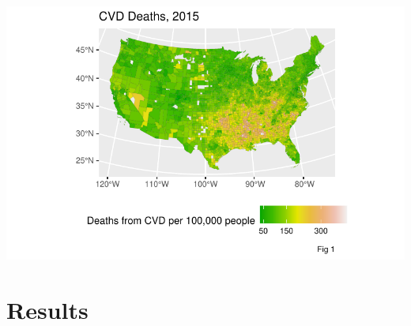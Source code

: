 \documentclass[
]{article}
\begin{document}
\includegraphics{report_files/figure-pdf/unnamed-chunk-2-1.pdf}

\section{Results}\label{results}
\end{document}
